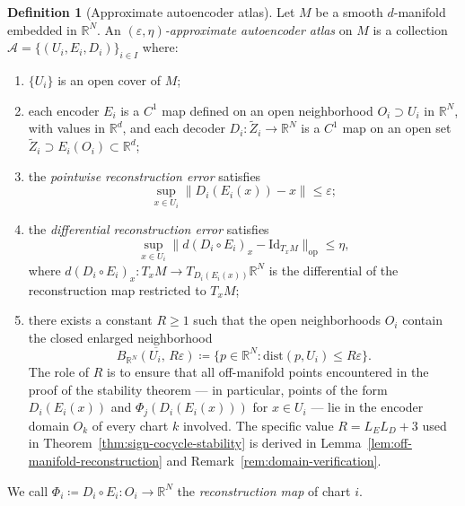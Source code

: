 \documentclass[11pt]{article}
\newcommand{\R}{\mathbb{R}}
\newcommand{\Id}{\mathrm{Id}}
\theoremstyle{plain}
\theoremstyle{definition}
\newtheorem{definition}[theorem]{Definition}
\theoremstyle{remark}
\begin{document}
\begin{definition}[Approximate autoencoder atlas]\label{def:approximate-atlas}
Let $M$ be a smooth $d$-manifold embedded in $\R^N$. An \emph{$(\varepsilon, \eta)$-approximate autoencoder atlas} on $M$ is a collection $\mathcal{A} = \{(U_i, E_i, D_i)\}_{i \in I}$ where:
\begin{enumerate}
    \item $\{U_i\}$ is an open cover of $M$;
    \item each encoder $E_i$ is a $C^1$ map defined on an open neighborhood $O_i \supset U_i$ in $\R^N$, with values in $\R^d$, and each decoder $D_i \colon \tilde{Z}_i \to \R^N$ is a $C^1$ map on an open set $\tilde{Z}_i \supset E_i(O_i) \subset \R^d$;
    \item the \emph{pointwise reconstruction error} satisfies
    \[
    \sup_{x \in U_i} \| D_i(E_i(x)) - x \| \leq \varepsilon;
    \]
    \item the \emph{differential reconstruction error} satisfies
    \[
    \sup_{x \in U_i} \| d(D_i \circ E_i)_x - \Id_{T_x M} \|_{\mathrm{op}} \leq \eta,
    \]
    where $d(D_i \circ E_i)_x \colon T_x M \to T_{D_i(E_i(x))} \R^N$ is the differential of the reconstruction map restricted to $T_x M$;
    \item there exists a constant $R \geq 1$ such that the open neighborhoods
    $O_i$ contain the closed enlarged neighborhood
    \[
    \overline{B_{\R^N}(U_i,\, R\varepsilon)} \coloneqq \{p \in \R^N : \mathrm{dist}(p, U_i) \leq R\varepsilon\}.
    \]
    The role of $R$ is to ensure that all off-manifold points encountered
    in the proof of the stability theorem — in particular, points of the
    form $D_i(E_i(x))$ and $\Phi_j(D_i(E_i(x)))$ for $x \in U_i$ — lie in
    the encoder domain $O_k$ of every chart $k$ involved.  The specific
    value $R = L_E L_D + 3$ used in Theorem~\ref{thm:sign-cocycle-stability}
    is derived in Lemma~\ref{lem:off-manifold-reconstruction} and
    Remark~\ref{rem:domain-verification}.
\end{enumerate}
We call $\Phi_i \coloneqq D_i \circ E_i \colon O_i \to \R^N$ the
\emph{reconstruction map} of chart $i$.
\end{definition}
\end{document}
